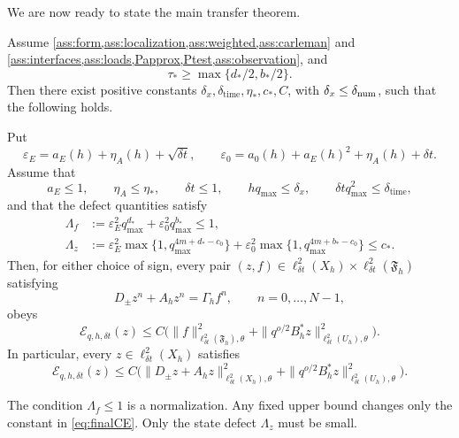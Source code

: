 \documentclass[print,wide,eng]{draft}
\begin{document}
We are now ready to state the main transfer theorem.

\begin{theorem}\label{thm:main}
Assume
\cref{ass:form,ass:localization,ass:weighted,ass:carleman} and \cref{ass:interfaces,ass:loads,Papprox,Ptest,ass:observation},
and
\begin{equation}\label{eq:weightcoverage}
\tau_*\ge\max\{d_*/2,b_*/2\}.
\end{equation}
Then there exist positive constants
$\delta_x,\delta_{\mathrm{time}},\eta_*,c_*,C$, with
$\delta_x\le\delta_{\rm num}$, such that the following holds.

Put
\begin{equation}
\varepsilon_E=a_E(h)+\eta_A(h)+\sqrt{\delta t},
\qquad
\varepsilon_0=a_0(h)+a_E(h)^2+\eta_A(h)+\delta t.
\label{eq:error-scales}
\end{equation}
Assume that
\[
a_E\le1,\qquad
\eta_A\le\eta_*,\qquad
\delta t\le1,\qquad
hq_{\max}\le\delta_x,\qquad
\delta t q_{\max}^2\le\delta_{\mathrm{time}},
\]
and that the defect quantities satisfy
\begin{align}
\Lambda_f
&:=\varepsilon_E^2q_{\max}^{d_*}
+\varepsilon_0^2q_{\max}^{b_*}\le1,
\label{eq:transfer-defects}\\
\Lambda_z
&:=\varepsilon_E^2\max\{1,q_{\max}^{4m+d_*-c_0}\}
+\varepsilon_0^2\max\{1,q_{\max}^{4m+b_*-c_0}\}\le c_*.
\label{eq:transfer-state-defect}
\end{align}
Then, for either choice of sign, every pair
$(z,f)\in\ell_{\delta t}^2(X_h)\times\ell_{\delta t}^2(\mathfrak F_h)$
satisfying
\begin{equation}
D_\pm z^n+A_hz^n=\Gamma_hf^n,
\qquad n=0,\ldots,N-1,
\label{eq:state-load-equation}
\end{equation}
obeys
\begin{equation}\label{eq:finalCE}
\mathcal{E}_{q,h,\delta t}(z)
\le C\bigl(
\|f\|_{\ell_{\delta t}^2(\mathfrak F_h),\theta}^2
+\|q^{o/2}B_h^*z\|_{\ell_{\delta t}^2(U_h),\theta}^2
\bigr).
\end{equation}
In particular, every $z\in\ell_{\delta t}^2(X_h)$ satisfies
\begin{equation}\label{eq:rawCE}
\mathcal{E}_{q,h,\delta t}(z)
\le C\bigl(
\|D_\pm z+A_hz\|_{\ell_{\delta t}^2(X_h),\theta}^2
+\|q^{o/2}B_h^*z\|_{\ell_{\delta t}^2(U_h),\theta}^2
\bigr).
\end{equation}
\end{theorem}




The condition $\Lambda_f\le1$ is a normalization. Any fixed upper bound changes only the constant in \cref{eq:finalCE}. Only the state defect $\Lambda_z$ must be small.
\end{document}
